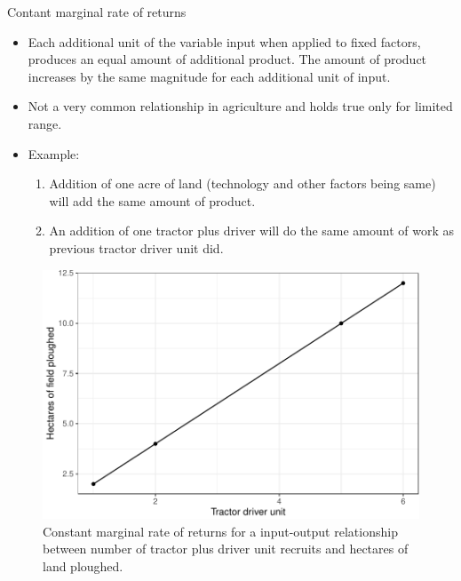 \documentclass[12pt,ignorenonframetext,aspectratio=169]{beamer}
\providecommand{\tightlist}{%
  \setlength{\itemsep}{0pt}\setlength{\parskip}{0pt}}
\begin{document}
\begin{frame}{Contant marginal rate of returns}
\protect\hypertarget{contant-marginal-rate-of-returns}{}
\begin{itemize}
\tightlist
\item
  Each additional unit of the variable input when applied to fixed
  factors, produces an equal amount of additional product. The amount of
  product increases by the same magnitude for each additional unit of
  input.
\item
  Not a very common relationship in agriculture and holds true only for
  limited range.
\item
  Example:

  \begin{enumerate}
  \tightlist
  \item
    Addition of one acre of land (technology and other factors being
    same) will add the same amount of product.
  \item
    An addition of one tractor plus driver will do the same amount of
    work as previous tractor driver unit did.
  \end{enumerate}
\end{itemize}
\end{frame}

\begin{frame}{}
\protect\hypertarget{section-1}{}
\begin{figure}
\includegraphics[width=0.7\linewidth]{04-production_function_files/figure-beamer/tractor-driver-unit-cmr-fig-1} \caption{Constant marginal rate of returns for a input-output relationship between number of tractor plus driver unit recruits and hectares of land ploughed.}\label{fig:tractor-driver-unit-cmr-fig}
\end{figure}
\end{frame}
\end{document}
